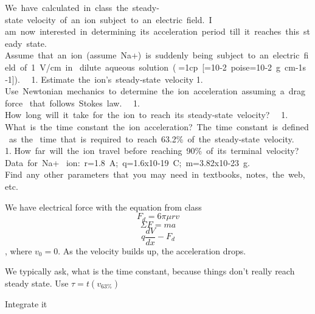 \documentclass{article}
\begin{document}
    We~have~calculated~in~class~the~steady‐state~velocity~of~an~ion~subject~to~an~electric~field.~I~
am~now~interested~in~determining~its~acceleration~period~till~it~reaches~this~steady~state.~
Assume~that~an~ion~(assume~Na+)~is~suddenly~being~subject~to~an~electric~field~of~1~V/cm~in~
dilute~aqueous~solution~(=1cp~{[}=10‐2~poise=10‐2~g~cm‐1s ‐1{]}).~~ 1.
Estimate~the~ion's~steady‐state~velocity 1.
Use~Newtonian~mechanics~to~determine~the~ion~acceleration~assuming~a~drag~force~
that~follows~Stokes~law.~~ 1.
How~long~will~it~take~for~the~ion~to~reach~its~steady‐state~velocity?~~
1.
What~is~the~time~constant~the~ion~acceleration?~The~time~constant~is~defined~as~the~
time~that~is~required~to~reach~63.2\%~of~the~steady‐state~velocity.~~~~
1.
How~far~will~the~ion~travel~before~reaching~90\%~of~its~terminal~velocity?~~
Data~for~Na+ ~ion:~r=1.8~A;~q=1.6x10‐19~C;~m=3.82x10‐23~g.~~
Find~any~other~parameters~that~you~may~need~in~textbooks,~notes,~the~web,~etc.~

    We have electrical force with the equation from class
\[F_d = 6\pi \mu r v\] \[\Sigma F = ma\] \[q\frac{dV}{dx} - F_d\], where
$v_0=0$. As the velocity builds up, the acceleration drops.

We typically ask, what is the time constant, because things don't really
reach steady state. Use $\tau=t(v_{63\%})$

Integrate it
\end{document}
